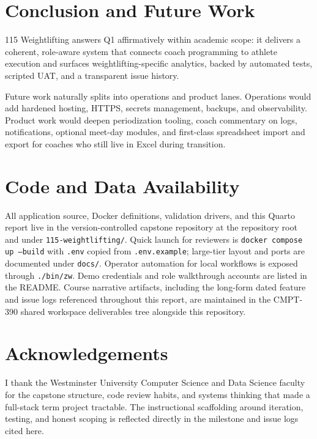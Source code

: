 \documentclass[
  letterpaper,
  DIV=11,
  numbers=noendperiod]{scrartcl}
\begin{document}
\section{Conclusion and Future Work}\label{conclusion-and-future-work}

115 Weightlifting answers Q1 affirmatively within academic scope: it
delivers a coherent, role-aware system that connects coach programming
to athlete execution and surfaces weightlifting-specific analytics,
backed by automated tests, scripted UAT, and a transparent issue
history.

Future work naturally splits into operations and product lanes.
Operations would add hardened hosting, HTTPS, secrets management,
backups, and observability. Product work would deepen periodization
tooling, coach commentary on logs, notifications, optional meet-day
modules, and first-class spreadsheet import and export for coaches who
still live in Excel during transition.

\clearpage

\section{Code and Data Availability}\label{code-and-data-availability}

All application source, Docker definitions, validation drivers, and this
Quarto report live in the version-controlled capstone repository at the
repository root and under \texttt{115-weightlifting/}. Quick launch for
reviewers is \texttt{docker compose up --build} with \texttt{.env}
copied from \texttt{.env.example}; large-tier layout and ports are
documented under \texttt{docs/}. Operator automation for local workflows
is exposed through \texttt{./bin/zw}. Demo credentials and role
walkthrough accounts are listed in the README. Course narrative
artifacts, including the long-form dated feature and issue logs
referenced throughout this report, are maintained in the CMPT-390 shared
workspace deliverables tree alongside this repository.

\section{Acknowledgements}\label{acknowledgements}

I thank the Westminster University Computer Science and Data Science
faculty for the capstone structure, code review habits, and systems
thinking that made a full-stack term project tractable. The
instructional scaffolding around iteration, testing, and honest scoping
is reflected directly in the milestone and issue logs cited here.
\end{document}
